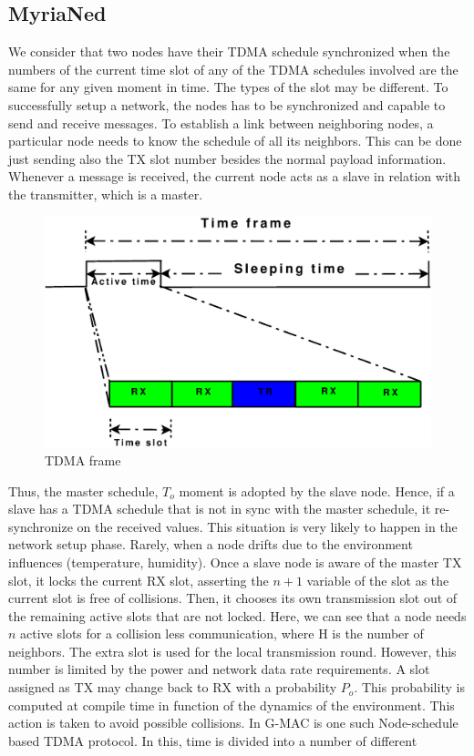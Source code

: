 \documentclass[a4paper,8pt]{report}
\begin{document}
\subsection{MyriaNed}We consider that two
nodes have their TDMA schedule synchronized when the numbers of the
current time slot of any of the TDMA schedules involved are the same
for any given moment in time. The types of the slot may be
different. To successfully setup a network, the nodes has to be
synchronized and capable to send and receive messages. To establish
a link between neighboring nodes, a particular node needs to know
the schedule of all its neighbors. This can be done just sending
also the TX slot number besides the normal payload information.
Whenever a message is received, the current node acts as a slave in
relation with the transmitter, which is a master.
\begin{figure}
\centering
\includegraphics[width= 0.5 \textwidth]{tdmaframe}
\caption{TDMA frame}
\end{figure}
Thus, the master schedule, $T_o$ moment is adopted by the slave
node. Hence, if a slave has a TDMA schedule that is not in sync with
the master schedule, it re-synchronize on the received values. This
situation is very likely to happen in the network setup phase.
Rarely, when a node drifts due to the environment influences
(temperature, humidity). Once a slave node is aware of the master TX
slot, it locks the current RX slot, asserting the $n+1$ variable of
the slot as the current slot is free of collisions. Then, it chooses
its own transmission slot out of the remaining active slots that are
not locked. Here, we can see that a node needs $n$ active slots for
a collision less communication, where H is the number of neighbors.
The extra slot is used for the local transmission round. However,
this number is limited by the power and network data rate
requirements. A slot assigned as TX may change back to RX with a
probability $P_o$. This probability is computed at compile time in
function of the dynamics of the environment. This action is taken to
avoid possible collisions. In G-MAC is one such Node-schedule based
TDMA protocol. In this, time is divided into a number of different
\end{document}
